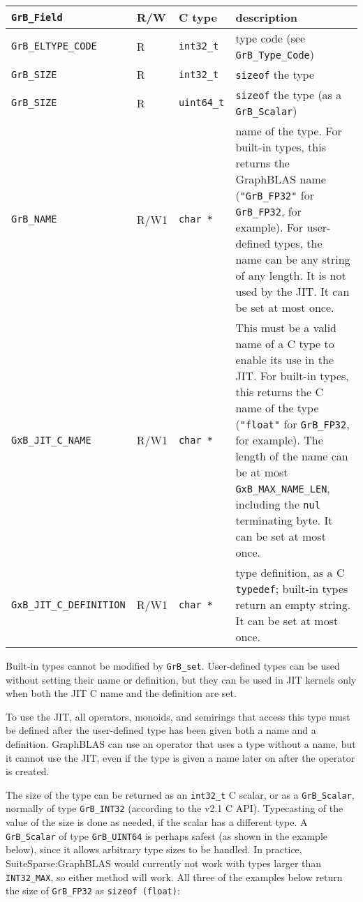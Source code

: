 \noindent
{\small
\begin{tabular}{|l|l|l|p{2.85in}|}
\hline
\verb'GrB_Field'                    & R/W  & C type        & description \\
\hline
\verb'GrB_ELTYPE_CODE'              & R    & \verb'int32_t'& type code (see \verb'GrB_Type_Code') \\
\verb'GrB_SIZE'                     & R    & \verb'int32_t'& \verb'sizeof' the type \\
\verb'GrB_SIZE'                     & R    & \verb'uint64_t'& \verb'sizeof' the type
                                           (as a \verb'GrB_Scalar') \\
\hline
\verb'GrB_NAME'                     & R/W1 & \verb'char *' &    %
    name of the type.  For built-in types, this returns the GraphBLAS
    name (\verb'"GrB_FP32"' for \verb'GrB_FP32', for example).
    For user-defined types, the name can be any string of any length.  It is
    not used by the JIT.  It can be set at most once. \\
\verb'GxB_JIT_C_NAME'               & R/W1 & \verb'char *' & 
    This must be a valid name of a C type to enable its use in the JIT.  For
    built-in types, this returns the C name of the type (\verb'"float"' for
    \verb'GrB_FP32', for example). The length of the name can be at most
    \verb'GxB_MAX_NAME_LEN', including the \verb'nul' terminating byte.  It can
    be set at most once. \\
\verb'GxB_JIT_C_DEFINITION'               & R/W1 & \verb'char *' &
    type definition, as a C \verb'typedef';
    built-in types return an empty string. 
    It can be set at most once. \\
\hline
\end{tabular}
}

Built-in types cannot be modified by \verb'GrB_set'.  User-defined types can be
used without setting their name or definition, but they can be used in JIT
kernels only when both the JIT C name and the definition are set.

To use the JIT, all operators, monoids, and semirings that access this type
must be defined after the user-defined type has been given both a name and a
definition.  GraphBLAS can use an operator that uses a type without a name,
but it cannot use the JIT, even if the type is given a name later on after
the operator is created.

The size of the type can be returned as an \verb'int32_t' C scalar, or as a
\verb'GrB_Scalar', normally of type \verb'GrB_INT32' (according to the v2.1 C
API).  Typecasting of the value of the size is done as needed, if the scalar
has a different type.  A \verb'GrB_Scalar' of type \verb'GrB_UINT64' is perhaps
safest (as shown in the example below), since it allows arbitrary type sizes to
be handled.  In practice, SuiteSparse:GraphBLAS would currently not work with
types larger than \verb'INT32_MAX', so either method will work.  All three of
the examples below return the size of \verb'GrB_FP32' as \verb'sizeof (float)':

